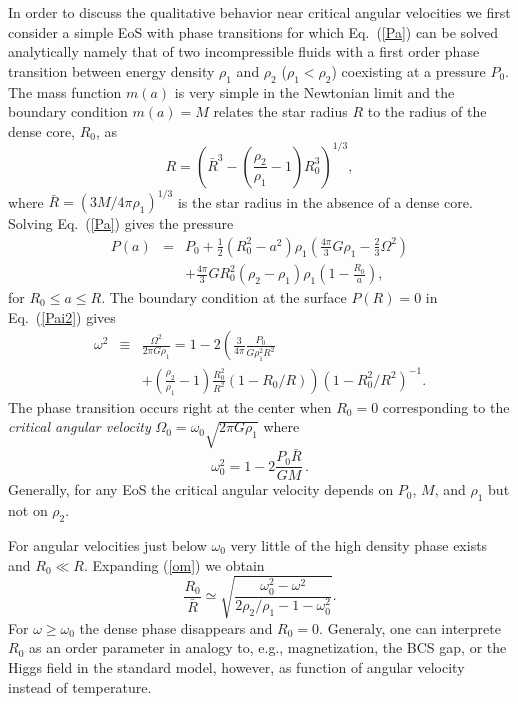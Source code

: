 \begin{multicols}{2}
In order to discuss the qualitative behavior near critical angular
velocities we first consider a simple EoS with phase transitions for which
Eq.\ (\ref{Pa}) can be solved analytically namely that of
two incompressible fluids with a first order phase transition
between energy density
$\rho_1$ and $\rho_2$ ($\rho_1<\rho_2$) 
coexisting at a pressure $P_0$.
The mass function $m(a)$ is very simple 
in the Newtonian limit and the boundary condition $m(a)=M$
relates the star radius $R$ to the radius of the dense core, $R_0$, as
\begin{equation}
    R = \left(\bar{R}^3-(\frac{\rho_2}{\rho_1}-1)R_0^3\right)^{1/3}, 
\end{equation}
where $\bar{R}=(3M/4\pi\rho_1)^{1/3}$ is the star radius
in the absence of a dense core.
Solving Eq.\ (\ref{Pa}) gives the pressure
\begin{eqnarray}
    P(a)&=&P_0+\frac{1}{2}(R_0^2-a^2)\rho_1(\frac{4\pi}{3}G\rho_1
     -\frac{2}{3}\Omega^2)\nonumber \\ 
    && +\frac{4\pi}{3}GR_0^2(\rho_2-\rho_1)\rho_1(1-\frac{R_0}{a}),
     \label{Pai2}
\end{eqnarray}
for $R_0\le a\le R$.
The boundary condition at the surface $P(R)=0$ in
Eq.\  (\ref{Pai2}) gives 
\begin{eqnarray}
  \omega^2 & \equiv &\frac{\Omega^2}{2\pi G\rho_1}
  = 1-2\left(\frac{3}{4\pi}\frac{P_0}{G\rho_1^2R^2} \right. \nonumber \\
    & & \left. +(\frac{\rho_2}{\rho_1}-1)\frac{R_0^2}{R^2}(1-R_0/R) \right)
               (1-R_0^2/R^2)^{-1}. \label{om}
\end{eqnarray}
The phase transition occurs right at the center when $R_0=0$ corresponding to
the {\it critical angular velocity} $\Omega_0=\omega_0\sqrt{2\pi G\rho_1}$
where
\begin{equation}
   \omega_0^2= 1-2\frac{P_0\bar{R}}{GM} 
   \, .\label{o0}
\end{equation}
Generally, for any EoS the critical angular velocity depends on $P_0$, $M$, 
and $\rho_1$ but not on $\rho_2$.

For angular velocities just below $\omega_0$ very little of 
the high density phase exists and $R_0\ll R$. Expanding (\ref{om}) we obtain
\begin{equation}
  \frac{R_0}{\bar{R}} \simeq \sqrt{\frac{\omega_0^2-\omega^2}
             {2\rho_2/\rho_1-1-\omega_0^2}}. 
  \label{R0}
\end{equation}
For $\omega\ge\omega_0$ the dense phase disappears and $R_0=0$.
Generaly, one can interprete $R_0$ as an order parameter 
in analogy to, e.g., magnetization, the BCS gap, or the Higgs
field in the standard model, however, as function of
angular velocity instead of temperature.


\end{multicols}

